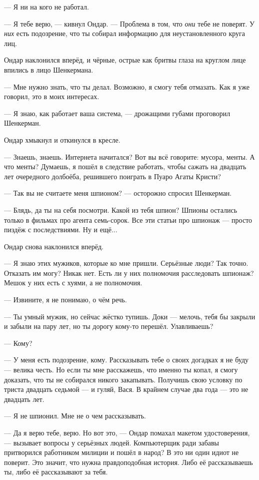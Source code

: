 --- Я ни на кого не работал.

--- Я тебе верю, --- кивнул Ондар.
--- Проблема в том, что \emph{они} тебе не поверят.
У \emph{них} есть подозрение, что ты собирал информацию для неустановленного круга лиц.

Ондар наклонился вперёд, и чёрные, острые как бритвы глаза на круглом лице впились в лицо Шенкермана.

--- Мне нужно знать, что ты делал.
Возможно, я смогу тебя отмазать.
Как я уже говорил, это в моих интересах.

--- Я знаю, как работает ваша система, --- дрожащими губами проговорил Шенкерман.

Ондар хмыкнул и откинулся в кресле.

--- Знаешь, знаешь.
Интернета начитался?
Вот вы всё говорите: мусора, менты.
А что менты?
Думаешь, я пошёл в следствие работать, чтобы сажать на двадцать лет очередного долбоёба, решившего поиграть в Пуаро Агаты Кристи?

--- Так вы не считаете меня шпионом? --- осторожно спросил Шенкерман.

--- Блядь, да ты на себя посмотри.
Какой из тебя шпион?
Шпионы остались только в фильмах про агента семь-сорок.
Все эти статьи про шпионаж --- просто пиздёж с последствиями.
Ну и ещё...

Ондар снова наклонился вперёд.

--- Я знаю этих мужиков, которые ко мне пришли.
Серьёзные люди?
Так точно.
Отказать им могу?
Никак нет.
Есть ли у них полномочия расследовать шпионаж?
Мешок у них есть с хуями, а не полномочия.

--- Извините, я не понимаю, о чём речь.

--- Ты умный мужик, но сейчас жёстко тупишь.
Доки --- мелочь, тебя бы закрыли и забыли на пару лет, но ты дорогу кому-то перешёл.
Улавливаешь?

--- Кому?

--- У меня есть подозрение, кому.
Рассказывать тебе о своих догадках я не буду --- велика честь.
Но если ты мне расскажешь, что именно ты копал, я смогу доказать, что ты не собирался никого закапывать.
Получишь свою условку по триста двадцать седьмой --- и гуляй, Вася.
В крайнем случае два года --- это не двадцать лет.

--- Я не шпионил.
Мне не о чем рассказывать.

--- Да я верю тебе, верю.
Но вот это, --- Ондар помахал макетом удостоверения, --- вызывает вопросы у серьёзных людей.
Компьютерщик ради забавы притворился работником милиции и пошёл в народ?
В это ни один идиот не поверит.
Это значит, что нужна правдоподобная история.
Либо её рассказываешь ты, либо её рассказывают за тебя.

